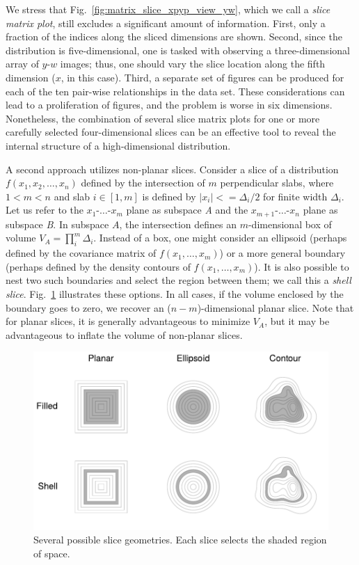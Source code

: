 \documentclass[%
 reprint,
 amsmath,amssymb,
 aps,
prstab,
]{revtex4-2}
\begin{document}
We stress that Fig.~\ref{fig:matrix_slice_xpyp_view_yw}, which we call a \textit{slice matrix plot}, still excludes a significant amount of information. First, only a fraction of the indices along the sliced dimensions are shown. Second, since the distribution is five-dimensional, one is tasked with observing a three-dimensional array of $y$-$w$ images; thus, one should vary the slice location along the fifth dimension ($x$, in this case). Third, a separate set of figures can be produced for each of the ten pair-wise relationships in the data set. These considerations can lead to a proliferation of figures, and the problem is worse in six dimensions. Nonetheless, the combination of several slice matrix plots for one or more carefully selected four-dimensional slices can be an effective tool to reveal the internal structure of a high-dimensional distribution.

A second approach utilizes non-planar slices. Consider a slice of a distribution $f(x_1, x_2, \dots, x_n)$ defined by the intersection of $m$ perpendicular slabs, where $1 < m < n$ and slab $i\in[1, m]$ is defined by $|x_i| <= \Delta_i / 2$ for finite width $\Delta_i$. Let us refer to the $x_1$-$\dots$-$x_m$ plane as subspace \textit{A} and the $x_{m + 1}$-$\dots$-$x_n$ plane as subspace \textit{B}. In subspace $A$, the intersection defines an $m$-dimensional box of volume $V_A = \prod_{i}^{m}\Delta_i$. Instead of a box, one might consider an ellipsoid (perhaps defined by the covariance matrix of $f(x_1, \dots, x_m)$) or a more general boundary (perhaps defined by the density contours of $f(x_1, \dots, x_m)$). It is also possible to nest two such boundaries and select the region between them; we call this a \textit{shell slice}. Fig.~\ref{fig:slices} illustrates these options. In all cases, if the volume enclosed by the boundary goes to zero, we recover an ($n - m$)-dimensional planar slice. Note that for planar slices, it is generally advantageous to minimize $V_A$, but it may be advantageous to inflate the volume of non-planar slices.
%
\begin{figure}
    \centering
    \includegraphics[width=0.85\columnwidth]{fig_slice_diagram.pdf}
    \caption{Several possible slice geometries. Each slice selects the shaded region of space.}
    \label{fig:slices}
\end{figure}
%
\end{document}
